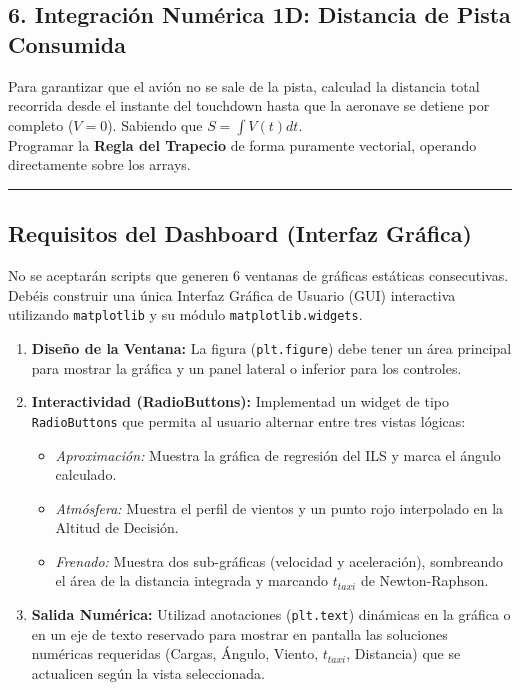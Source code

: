 	\subsection*{6. Integración Numérica 1D: Distancia de Pista Consumida}
	Para garantizar que el avión no se sale de la pista, calculad la distancia total recorrida desde el instante del touchdown hasta que la aeronave se detiene por completo ($V = 0$). Sabiendo que $S = \int V(t) dt$. \\
	 Programar la \textbf{Regla del Trapecio} 
	 de forma puramente vectorial, operando directamente sobre los arrays.
	
	\vspace{0.3cm}
	\hrule
	\vspace{0.3cm}
	
	\subsection*{Requisitos del Dashboard (Interfaz Gráfica)}
	
	No se aceptarán scripts que generen 6 ventanas de gráficas estáticas consecutivas. Debéis construir una única Interfaz Gráfica de Usuario (GUI) interactiva utilizando \texttt{matplotlib} y su módulo \texttt{matplotlib.widgets}.
	
	\begin{enumerate}
		\item \textbf{Diseño de la Ventana:} La figura (\texttt{plt.figure}) debe tener un área principal para mostrar la gráfica y un panel lateral o inferior para los controles.
		\item \textbf{Interactividad (RadioButtons):} Implementad un widget de tipo \texttt{RadioButtons} que permita al usuario alternar entre tres vistas lógicas:
		\begin{itemize}
			\item \textit{Aproximación:} Muestra la gráfica de regresión del ILS y marca el ángulo calculado.
			\item \textit{Atmósfera:} Muestra el perfil de vientos y un punto rojo interpolado en la Altitud de Decisión.
			\item \textit{Frenado:} Muestra dos sub-gráficas (velocidad y aceleración), sombreando el área de la distancia integrada y marcando $t_{taxi}$ de Newton-Raphson.
		\end{itemize}
		\item \textbf{Salida Numérica:} Utilizad anotaciones (\texttt{plt.text}) dinámicas en la gráfica o en un eje de texto reservado para mostrar en pantalla las soluciones numéricas requeridas (Cargas, Ángulo, Viento, $t_{taxi}$, Distancia) que se actualicen según la vista seleccionada.
	\end{enumerate}
	
